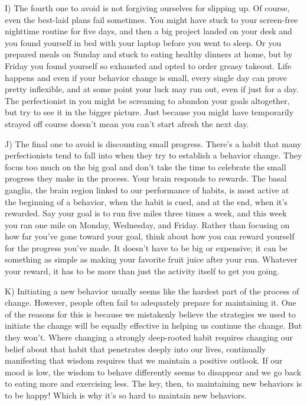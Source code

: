 \documentclass[UTF8,11pt]{ctexart}
\begin{document}
I) The fourth one to avoid is not forgiving ourselves for slipping up. Of course, even the best-laid plans fail sometimes. You might have stuck to your screen-free nighttime routine for five days, and then a big project landed on your desk and you found yourself in bed with your laptop before you went to sleep. Or you prepared meals on Sunday and stuck to eating healthy dinners at home, but by Friday you found yourself so exhausted and opted to order greasy takeout. Life happens and even if your behavior change is small, every single day can prove pretty inflexible, and at some point your luck may run out, even if just for a day. The perfectionist in you might be screaming to abandon your goals altogether, but try to see it in the bigger picture. Just because you might have temporarily strayed off course doesn’t mean you can’t start afresh the next day.


J) The final one to avoid is discounting small progress. There’s a habit that many perfectionists tend to fall into when they try to establish a behavior change. They focus too much on the big goal and don’t take the time to celebrate the small progress they make in the process. Your brain responds to rewards. The basal ganglia, the brain region linked to our performance of habits, is most active at the beginning of a behavior, when the habit is cued, and at the end, when it’s rewarded. Say your goal is to run five miles three times a week, and this week you ran one mile on Monday, Wednesday, and Friday. Rather than focusing on how far you’ve gone toward your goal, think about how you can reward yourself for the progress you’ve made. It doesn’t have to be big or expensive; it can be something as simple as making your favorite fruit juice after your run. Whatever your reward, it has to be more than just the activity itself to get you going.


K) Initiating a new behavior usually seems like the hardest part of the process of change. However, people often fail to adequately prepare for maintaining it. One of the reasons for this is because we mistakenly believe the strategies we used to initiate the change will be equally effective in helping us continue the change. But they won’t. Where changing a strongly deep-rooted habit requires changing our belief about that habit that penetrates deeply into our lives, continually manifesting that wisdom requires that we maintain a positive outlook. If our mood is low, the wisdom to behave differently seems to disappear and we go back to eating more and exercising less. The key, then, to maintaining new behaviors is to be happy! Which is why it’s so hard to maintain new behaviors.
\end{document}

